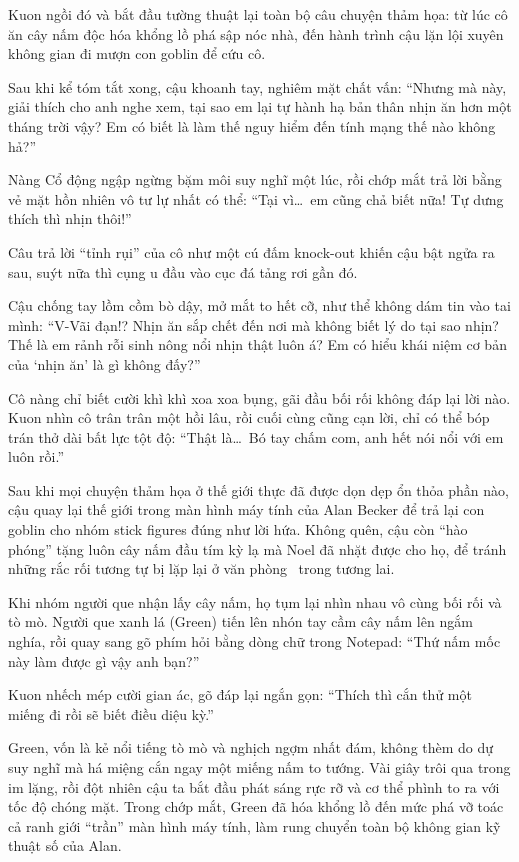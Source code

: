 \documentclass[../main.tex]{subfiles}
\begin{document}
Kuon ngồi đó và bắt đầu tường thuật lại toàn bộ câu chuyện thảm họa: từ lúc cô ăn cây nấm độc hóa khổng lồ phá sập nóc nhà, đến hành trình cậu lặn lội xuyên không gian đi mượn con goblin để cứu cô.

Sau khi kể tóm tắt xong, cậu khoanh tay, nghiêm mặt chất vấn: ``Nhưng mà này, giải thích cho anh nghe xem, tại sao em lại tự hành hạ bản thân nhịn ăn hơn một tháng trời vậy? Em có biết là làm thế nguy hiểm đến tính mạng thế nào không hả?''

Nàng Cổ động ngập ngừng bặm môi suy nghĩ một lúc, rồi chớp mắt trả lời bằng vẻ mặt hồn nhiên vô tư lự nhất có thể: ``Tại vì\dots\ em cũng chả biết nữa! Tự dưng thích thì nhịn thôi!''

Câu trả lời ``tỉnh rụi'' của cô như một cú đấm knock-out khiến cậu bật ngửa ra sau, suýt nữa thì cụng u đầu vào cục đá tảng rơi gần đó.

Cậu chống tay lồm cồm bò dậy, mở mắt to hết cỡ, như thể không dám tin vào tai mình: ``V-Vãi đạn!? Nhịn ăn sắp chết đến nơi mà không biết lý do tại sao nhịn? Thế là em rảnh rỗi sinh nông nổi nhịn thật luôn á? Em có hiểu khái niệm cơ bản của `nhịn ăn' là gì không đấy?''

Cô nàng chỉ biết cười khì khì xoa xoa bụng, gãi đầu bối rối không đáp lại lời nào. Kuon nhìn cô trân trân một hồi lâu, rồi cuối cùng cũng cạn lời, chỉ có thể bóp trán thở dài bất lực tột độ: ``Thật là\dots\ Bó tay chấm com, anh hết nói nổi với em luôn rồi.''

Sau khi mọi chuyện thảm họa ở thế giới thực đã được dọn dẹp ổn thỏa phần nào, cậu quay lại thế giới trong màn hình máy tính của Alan Becker để trả lại con goblin cho nhóm stick figures đúng như lời hứa. Không quên, cậu còn ``hào phóng'' tặng luôn cây nấm đầu tím kỳ lạ mà Noel đã nhặt được cho họ, để tránh những rắc rối tương tự bị lặp lại ở văn phòng \hll\ trong tương lai.

Khi nhóm người que nhận lấy cây nấm, họ tụm lại nhìn nhau vô cùng bối rối và tò mò. Người que xanh lá (Green) tiến lên nhón tay cầm cây nấm lên ngắm nghía, rồi quay sang gõ phím hỏi bằng dòng chữ trong Notepad: ``Thứ nấm mốc này làm được gì vậy anh bạn?''

Kuon nhếch mép cười gian ác, gõ đáp lại ngắn gọn: ``Thích thì cắn thử một miếng đi rồi sẽ biết điều diệu kỳ.''

Green, vốn là kẻ nổi tiếng tò mò và nghịch ngợm nhất đám, không thèm do dự suy nghĩ mà há miệng cắn ngay một miếng nấm to tướng. Vài giây trôi qua trong im lặng, rồi đột nhiên cậu ta bắt đầu phát sáng rực rỡ và cơ thể phình to ra với tốc độ chóng mặt. Trong chớp mắt, Green đã hóa khổng lồ đến mức phá vỡ toác cả ranh giới ``trần'' màn hình máy tính, làm rung chuyển toàn bộ không gian kỹ thuật số của Alan.
\end{document}

